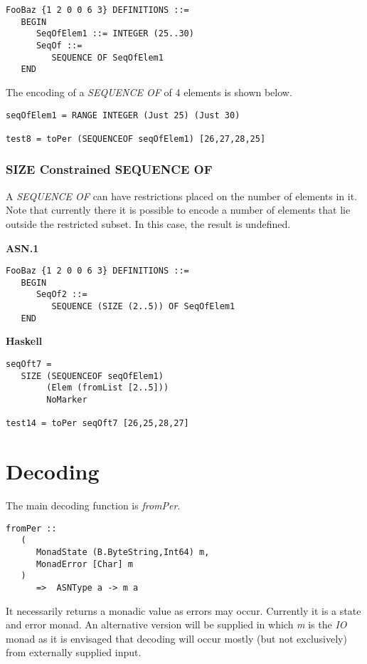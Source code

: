 \documentclass{article}
\begin{document}
\begin{lstlisting}[frame=single]
FooBaz {1 2 0 0 6 3} DEFINITIONS ::=
   BEGIN
      SeqOfElem1 ::= INTEGER (25..30)
      SeqOf ::=
         SEQUENCE OF SeqOfElem1
   END
\end{lstlisting}

The encoding of a {\em SEQUENCE OF} of 4 elements is shown
below.

\begin{lstlisting}[frame=single]
seqOfElem1 = RANGE INTEGER (Just 25) (Just 30)

test8 = toPer (SEQUENCEOF seqOfElem1) [26,27,28,25]
\end{lstlisting}

\subsubsection{SIZE Constrained SEQUENCE OF}

A {\em SEQUENCE OF} can have restrictions placed on the number
of elements in it. Note that currently there it is possible to
encode a number of elements that lie outside the restricted subset.
In this case, the result is undefined.

{\bf ASN.1}

\begin{lstlisting}[frame=single]
FooBaz {1 2 0 0 6 3} DEFINITIONS ::=
   BEGIN
      SeqOf2 ::=
         SEQUENCE (SIZE (2..5)) OF SeqOfElem1
   END
\end{lstlisting}

{\bf Haskell}

\begin{lstlisting}[frame=single]
seqOft7 = 
   SIZE (SEQUENCEOF seqOfElem1) 
        (Elem (fromList [2..5])) 
        NoMarker

test14 = toPer seqOft7 [26,25,28,27]
\end{lstlisting}

\section{Decoding}

The main decoding function is {\em fromPer}.

\begin{lstlisting}[frame=single]
fromPer :: 
   (
      MonadState (B.ByteString,Int64) m, 
      MonadError [Char] m
   ) 
      =>  ASNType a -> m a
\end{lstlisting}

It necessarily returns a monadic value as errors may occur. Currently it is a state and error monad. 
An alternative version will be supplied
in which {\em m} is the {\em IO} monad as it is envisaged that decoding will occur mostly (but not exclusively)
from externally supplied input.
\end{document}
